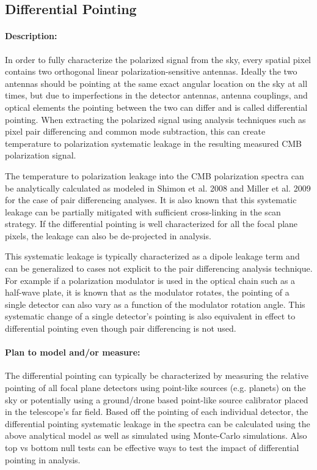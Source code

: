 \subsection{Differential Pointing}

\paragraph{Description:}
In order to fully characterize the polarized signal from the sky, every spatial pixel contains two orthogonal linear polarization-sensitive antennas. Ideally the two antennas should be pointing at the same exact angular location on the sky at all times, but due to imperfections in the detector antennas, antenna couplings, and optical elements the pointing between the two can differ and is called differential pointing. When extracting the polarized signal using analysis techniques such as pixel pair differencing and common mode subtraction, this can create temperature to polarization systematic leakage in the resulting measured CMB polarization signal.

The temperature to polarization leakage into the CMB polarization spectra can be analytically calculated as modeled in Shimon et al. 2008 \cite{Shimon_2008} and Miller et al. 2009 \cite{Miller2009Lensing,Miller2009CB} for the case of pair differencing analyses. It is also known that this systematic leakage can be partially mitigated with sufficient cross-linking in the scan strategy. If the differential pointing is well characterized for all the focal plane pixels, the leakage can also be de-projected in analysis. 

This systematic leakage is typically characterized as a dipole leakage term and can be generalized to cases not explicit to the pair differencing analysis technique. For example if a polarization modulator is used in the optical chain such as a half-wave plate, it is known that as the modulator rotates, the pointing of a single detector can also vary as a function of the modulator rotation angle. This systematic change of a single detector's pointing is also equivalent in effect to differential pointing even though pair differencing is not used.

\paragraph{Plan to model and/or measure:}
The differential pointing can typically be characterized by measuring the relative pointing of all focal plane detectors using point-like sources (e.g. planets) on the sky or potentially using a ground/drone based point-like source calibrator placed in the telescope's far field. Based off the pointing of each individual detector, the differential pointing systematic leakage in the spectra can be calculated using the above analytical model as well as simulated using Monte-Carlo simulations. Also top vs bottom null tests can be effective ways to test the impact of differential pointing in analysis.

